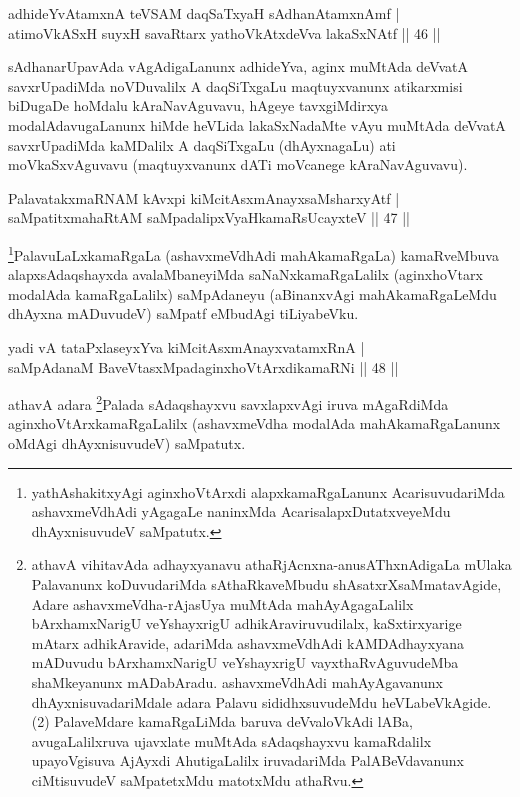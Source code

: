 
\begin{shl}
adhideYvAtamxnA teVSAM daqSaTxyaH sAdhanAtamxnAmf |\\
atimoVkASxH suyxH savaRtarx yathoVkAtxdeVva lakaSxNAtf \hfill || 46 ||
\end{shl}

\begin{artha}
sAdhanarUpavAda vAgAdigaLanunx adhideYva, aginx muMtAda deVvatA savxrUpadiMda noVDuvalilx A daqSiTxgaLu maqtuyxvanunx atikarxmisi biDugaDe hoMdalu kAraNavAguvavu, hAgeye tavxgiMdirxya modalAdavugaLanunx hiMde heVLida lakaSxNadaMte vAyu muMtAda deVvatA savxrUpadiMda kaMDalilx A daqSiTxgaLu (dhAyxnagaLu) ati moVkaSxvAguvavu (maqtuyxvanunx dATi moVcanege kAraNavAguvavu).
\end{artha}


\begin{shl}
PalavatakxmaRNAM kAvxpi kiMcitAsxmAnayxsaMsharxyAtf |\\
saMpatitxmahaRtAM saMpadalipxVyaHkamaRsUcayxteV \hfill || 47 ||
\end{shl}

\begin{artha}
\footnote[1]{yathAshakitxyAgi aginxhoVtArxdi alapxkamaRgaLanunx AcarisuvudariMda ashavxmeVdhAdi yAgagaLe naninxMda AcarisalapxDutatxveyeMdu dhAyxnisuvudeV saMpatutx.}PalavuLaLxkamaRgaLa (ashavxmeVdhAdi mahAkamaRgaLa) kamaRveMbuva alapxsA\-daqshayxda avalaMbaneyiMda saNaNxkamaRgaLalilx (aginxhoVtarx modalAda kamaRgaLalilx) saMpAdaneyu (aBinanxvAgi mahAkamaRgaLeMdu dhAyxna mADuvudeV) saMpatf eMbudAgi tiLiyabeVku.
\end{artha}


\begin{shl}
yadi vA tataPxlaseyxYva kiMcitAsxmAnayxvatamxRnA |\\
saMpAdanaM BaveVtasxMpadaginxhoVtArxdikamaRNi \hfill || 48 ||
\end{shl}

\begin{artha}
athavA adara \footnote[2]{athavA vihitavAda adhayxyanavu athaRjAcnxna-anusAThxnAdigaLa mUlaka Palavanunx koDuvuda\-riMda sAthaRkaveMbudu shAsatxrXsaMmatavAgide, Adare ashavxmeVdha-rAjasUya muMtAda \-mahAyAgagaLalilx bArxhamxNarigU veYshayxrigU adhikAraviruvudilalx, kaSxtirxyarige mAtarx adhikAravide, adariMda ashavxmeVdhAdi kAMDAdhayxyana mADuvudu bArxhamxNarigU veYshayxrigU vayxthaRvAguvudeMba shaMkeyanunx mADabAradu. ashavxmeVdhAdi mahAyAgavanunx dhAyxnisuvadariMdale adara Palavu sididhxsuvudeMdu heVLabeVkAgide. (2) PalaveMdare kamaRgaLiMda baruva deVvaloVkAdi lABa, avugaLalilxruva ujavxlate muMtAda sAdaqshayxvu kamaRdalilx upayoVgisuva AjAyxdi AhutigaLalilx iruvadariMda PalABeVdavanunx ciMtisuvudeV saMpatetxMdu matotxMdu athaRvu.}Palada sAdaqshayxvu savxlapxvAgi iruva mAgaRdiMda aginxhoVtArx\-kamaRgaLalilx (ashavxmeVdha modalAda mahAkamaRgaLanunx oMdAgi dhAyxnisuvudeV) saMpatutx.
\end{artha}

